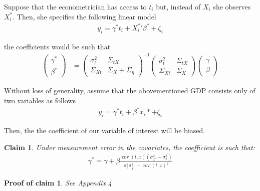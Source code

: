 \documentclass[10pt]{article}
\newtheorem{claim}{Claim}
\newtheorem{claimproof}{Proof of claim}[claim]
\begin{document}
        Suppose that the econometrician has access to $t_i$ but, instead of $X_i$ she observes $X^*_i$. Then, she specifies the following linear model
        \begin{align}
            y_i = \gamma^* t_i + {X^{*}_i}' \beta^* + \zeta_i
        \end{align}
        
        the coefficients would be such that
        \begin{align}
            \left(\begin{array}{l}
        {\gamma}^* \\
        {\beta}^*
        \end{array}\right)
        & =\left(\begin{array}{cc}
        {\sigma}^2_{t} & \Sigma_{tX} \\
        \Sigma_{Xt} & {\Sigma}_{X}+{\Sigma}_{\eta}
        \end{array}\right)^{-1}\left(\begin{array}{cc}
        {\sigma}^2_{t} & \Sigma_{tX} \\
        \Sigma_{Xt} & {\Sigma}_{X}
        \end{array}\right)\left(\begin{array}{l}
        {\gamma} \\
        {\beta}
        \end{array}\right)
        \end{align}
        
        Without loss of generality, assume that the abovementioned GDP consists only of two variables as follows
        \begin{align}
                    y_i = \gamma^* t_i +  \beta^*x_i* + \zeta_i
                \end{align}
        
	Then, the the coefficient of our variable of interest will be biased.
	\begin{claim}
	Under measurement error in the covariates, the coefficient is such that:
	\begin{align}
            \gamma^* = \gamma + \beta\frac{\operatorname{cov}(t,x)(\sigma^2_{x^*}-\sigma^2_x)}{\sigma_{t}^2\sigma_{x^*}^2-\operatorname{cov}({t,x})^2}
        \end{align}
	\end{claim}
	
\begin{claimproof}
	See Appendix 4
	\end{claimproof}
\end{document}
